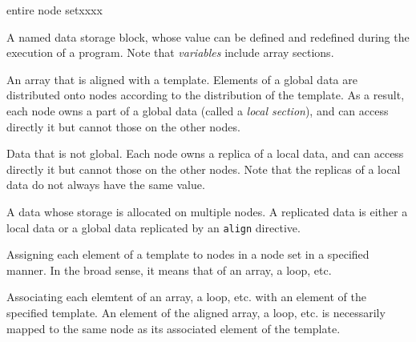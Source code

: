 \begin{namelist}{entire node setxxxx}


 A named data storage block, whose value can be defined and redefined
 during the execution of a program. Note that {\it variables} include
 array sections.


 An array that is aligned with a template. Elements of a global data are
 distributed onto nodes according to the distribution of the
 template. As a result, each node owns a part of a global data (called a
 {\it local section}), and can access directly it but cannot those on
 the other nodes.



 Data that is not global. Each node owns a replica of a local data,
 and can access directly it but cannot those on the other nodes. Note
 that the replicas of a local data do not always have the same value.



 A data whose storage is allocated on multiple nodes. A replicated data
 is either a local data or a global data replicated by an {\tt align}
 directive.


 Assigning each element of a template to nodes in a node set in a
 specified manner. In the broad sense, it means that of an array, a
 loop, etc.



 Associating each elemtent of an array, a loop, etc. with an element of
 the specified template. An element of the aligned array, a loop,
 etc. is necessarily mapped to the same node as its associated element
 of the template.



\end{namelist}
